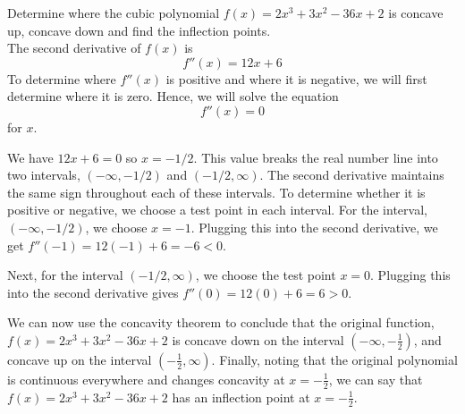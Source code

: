 \documentclass[handout]{ximera}
\begin{document}
\begin{example}[example 5]
Determine where the cubic polynomial $f(x) = 2x^3 + 3x^2 - 36x + 2$ is concave up, 
concave down and find the inflection points.\\
The second derivative of $f(x)$ is
\[
f''(x) = 12x + 6
\]
To determine where $f''(x)$ is positive and where it is negative, 
we will first determine where it is zero. Hence, we will solve the equation
\[f''(x) = 0\]
for $x$.

We have $12x + 6 = 0$ so $x = -1/2$.
This value breaks the real number line into two intervals, $(-\infty, -1/2)$ and $(-1/2, \infty)$.
The second derivative maintains the same sign throughout each of these intervals.  
To determine whether it is positive or negative, we choose a test point in each interval.
For the interval, $(-\infty, -1/2)$, we choose $x = -1$.  
Plugging this into the second derivative, we get
$f''(-1) = 12(-1) + 6 = -6 < 0$.  

Next, for the interval $(-1/2, \infty)$, we choose the test point 
$x = 0$.  Plugging this into the second derivative gives $f''(0) = 12(0) + 6 = 6 > 0$.





\begin{image}
\end{image}


We can now use the concavity theorem to conclude that
the original function,
$f(x) = 2x^3 + 3x^2 - 36x +2$ is concave down on the interval $(-\infty, -\frac12)$,
and concave up on the interval $(-\frac12, \infty)$.
Finally, noting that the original polynomial is continuous everywhere and changes 
concavity at $x = -\frac12$, 
we can say that
$f(x) = 2x^3 + 3x^2 - 36x +2$ has an inflection point at $x = -\frac12$.


\end{example}
\end{document}
